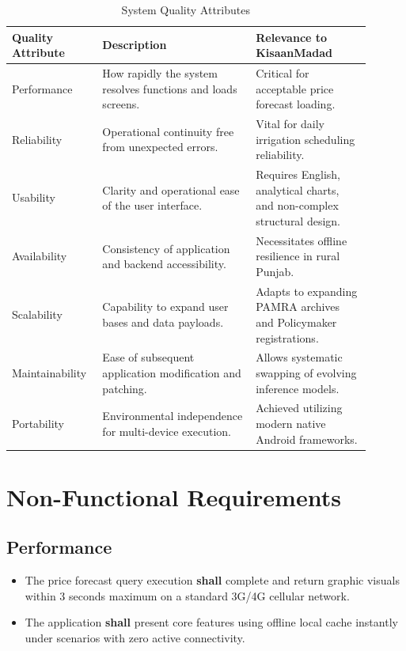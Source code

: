 \begin{table}[htbp]
  \centering
  \caption{System Quality Attributes}
  \label{tab:quality_attributes}
  \begin{tabular}{@{}p{0.2\linewidth} p{0.4\linewidth} p{0.3\linewidth}@{}}
    \toprule
    \textbf{Quality Attribute} & \textbf{Description} & \textbf{Relevance to KisaanMadad} \\
    \midrule
    Performance & How rapidly the system resolves functions and loads screens. & Critical for acceptable price forecast loading. \\
    Reliability & Operational continuity free from unexpected errors. & Vital for daily irrigation scheduling reliability. \\
    Usability & Clarity and operational ease of the user interface. & Requires English, analytical charts, and non-complex structural design. \\
    Availability & Consistency of application and backend accessibility. & Necessitates offline resilience in rural Punjab. \\
    Scalability & Capability to expand user bases and data payloads. & Adapts to expanding PAMRA archives and Policymaker registrations. \\
    Maintainability & Ease of subsequent application modification and patching. & Allows systematic swapping of evolving inference models. \\
    Portability & Environmental independence for multi-device execution. & Achieved utilizing modern native Android frameworks. \\
    \bottomrule
  \end{tabular}
\end{table}

\section{Non-Functional Requirements}

\subsection{Performance}
\begin{itemize}
    \item The price forecast query execution \textbf{shall} complete and return graphic visuals within 3 seconds maximum on a standard 3G/4G cellular network.
    \item The application \textbf{shall} present core features using offline local cache instantly under scenarios with zero active connectivity.
\end{itemize}

